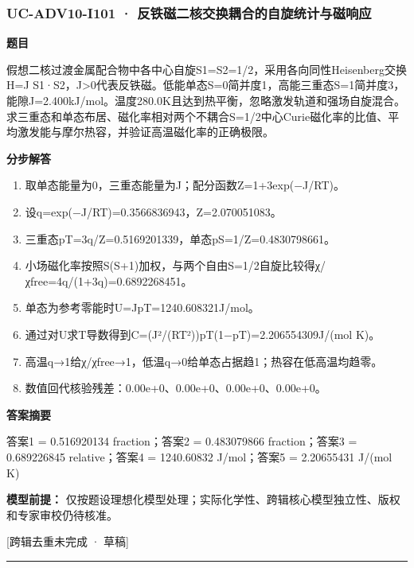 \documentclass[UTF8,11pt,a4paper]{ctexart}
\begin{document}
\subsubsection*{UC-ADV10-I101 · 反铁磁二核交换耦合的自旋统计与磁响应}
\noindent\textbf{题目}\par
假想二核过渡金属配合物中各中心自旋S1=S2=1/2，采用各向同性Heisenberg交换H=J S1·S2，J>0代表反铁磁。低能单态S=0简并度1，高能三重态S=1简并度3，能隙J=2.400kJ/mol。温度280.0K且达到热平衡，忽略激发轨道和强场自旋混合。求三重态和单态布居、磁化率相对两个不耦合S=1/2中心Curie磁化率的比值、平均激发能与摩尔热容，并验证高温磁化率的正确极限。\par
\medskip\noindent\textbf{分步解答}
\begin{enumerate}
\item 取单态能量为0，三重态能量为J；配分函数Z=1+3exp(−J/RT)。
\item 设q=exp(−J/RT)=0.3566836943，Z=2.070051083。
\item 三重态pT=3q/Z=0.5169201339，单态pS=1/Z=0.4830798661。
\item 小场磁化率按照S(S+1)加权，与两个自由S=1/2自旋比较得χ/χfree=4q/(1+3q)=0.6892268451。
\item 单态为参考零能时U=JpT=1240.608321J/mol。
\item 通过对U求T导数得到C=(J²/(RT²))pT(1−pT)=2.206554309J/(mol K)。
\item 高温q→1给χ/χfree→1，低温q→0给单态占据趋1；热容在低高温均趋零。
\item 数值回代核验残差：0.00e+0、0.00e+0、0.00e+0、0.00e+0。
\end{enumerate}
\noindent\textbf{答案摘要}\par
答案1 = 0.516920134 fraction；答案2 = 0.483079866 fraction；答案3 = 0.689226845 relative；答案4 = 1240.60832 J/mol；答案5 = 2.20655431 J/(mol K)\par
\noindent\textbf{模型前提：}
仅按题设理想化模型处理；实际化学性、跨辑核心模型独立性、版权和专家审校仍待核准。\par
\noindent\textcolor{red!65!black}{[跨辑去重未完成 · 草稿]} \par
\medskip\hrule\medskip
{}
\end{document}

